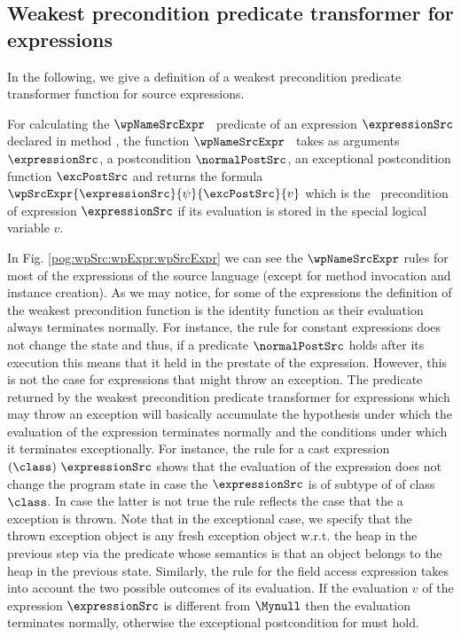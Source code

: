\subsection{Weakest precondition predicate transformer for expressions}\label{pog:wpSrc:wpExpr}
In the following, we  give a  definition of a weakest
precondition predicate transformer function for source expressions.

For calculating the  $\wpNameSrcExpr$ \ predicate  of  an expression $\expressionSrc$ declared in method \methodd,
 the function $\wpNameSrcExpr$ \ takes as arguments  $\expressionSrc$, a postcondition $\normalPostSrc$, an exceptional postcondition 
function $\excPostSrc$  and  returns the    formula $\wpSrcExpr{\expressionSrc}{\psi}{\excPostSrc}{ v }$ which is the \wpName \ precondition of expression $\expressionSrc$ 
if its evaluation is stored in the special logical variable $v$. 



In Fig. \ref{pog:wpSrc:wpExpr:wpSrcExpr} we can see the $\wpNameSrcExpr$ rules for  most of the expressions of the source language (except for method invocation 
and instance creation). As we may notice, for some of the expressions   
the definition of the weakest precondition function is the identity function
 as their evaluation always terminates normally. For instance, the rule for constant expressions does not change the state and thus,
 if a predicate $ \normalPostSrc$ holds
 after its execution this means that it held in the prestate of the expression. 
 However, this is not the case for expressions that might throw an exception. %
 The predicate returned by the weakest precondition predicate transformer for expressions which may throw an exception 
will basically accumulate the hypothesis under which the evaluation 
of the expression terminates normally and the  conditions under which it  terminates exceptionally.
 For instance, the rule for a cast expression $( \class ) \ \expressionSrc$ shows that the evaluation of the expression
does not change the program state in case the $ \expressionSrc$ is of subtype of of class  $\class$. In case the latter is not true 
the rule reflects the case that the a  \ClassCastExc{} exception is thrown.
Note that in the exceptional case, we specify  that the thrown exception object is any  fresh exception object w.r.t.  the heap in the previous step via the 
predicate \instances{} whose semantics is that an object  belongs to the heap in the previous state.
 Similarly, the rule for the field access expression takes into account
the two possible  outcomes of its evaluation. If the evaluation $v$ of the expression $\expressionSrc$ 
is different from $\Mynull$ then the evaluation terminates normally, otherwise the exceptional postcondition  
for \NullPointerExc{}  must hold.




